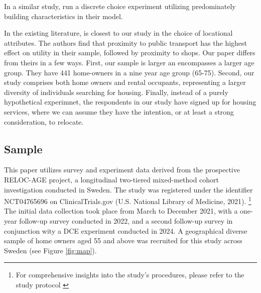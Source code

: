 \documentclass[3p,11pt ]{elsarticle}
\begin{document}
\cite{caplanMeasuringHeterogeneousPreferences2021}

In a similar study,\cite{ossokinaBestLivingConcepts2020} 
run a discrete choice experiment utilizing predominately building characteristics in their model.

In the existing literature,
\cite{ossokinaReferencedependentHousingChoice2022a} is closest to our study in the choice of locational attributes.
The authors find that proximity to public transport has the highest effect on utility in their sample, followed by proximity to shops.
Our paper differs from theirs in a few ways.
First,
our sample is larger an encompasses a larger age group.
They have 441 home-owners in a nine year age group (65-75).
Second,
our study comprises both home owners and rental occupants, representing a larger diversity of individuals searching for housing.
Finally,
instead of a purely hypothetical experimnet, the respondents in our study have signed up for housing services, where we can assume they have the intention, or at least a strong consideration, to relocate.




\subsection{Sample}

This paper utilizes survey and experiment data derived from the prospective RELOC-AGE project,
a longitudinal two-tiered mixed-method cohort investigation conducted in Sweden.
The study was registered under the identifier NCT04765696 on ClinicalTrials.gov (U.S. National Library of Medicine, 2021).
\footnote{For comprehensive insights into the study's procedures,
please refer to the study protocol  \cite{zingmarkExploringAssociationsHousing2021}}
The initial data collection took place from March to December 2021, with a one-year follow-up survey conducted in 2022, and a second follow-up survey in conjunction wity a DCE experiment conducted in 2024.
A geographical diverse sample of home owners aged 55 and above was recruited for this study across Sweden (see Figure \ref{fig:map}).
\end{document}
